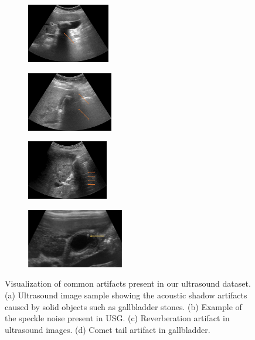 \begin{figure}[!t]
\centering
	\begin{subfigure}[b]{0.24\linewidth}
	\centering
	\includegraphics[width=\linewidth, height=7em]{figs/shadow.png}
		\caption{}
		\label{fig:usg_shadow}
	\end{subfigure}
	\begin{subfigure}[b]{0.24\linewidth}
	\centering
	\includegraphics[width=\linewidth, height=7em]{figs/speckle.png}
		\caption{}
		\label{fig:usg_speckle}
	\end{subfigure}
        \begin{subfigure}[b]{0.24\linewidth}
	\centering
	\includegraphics[width=\linewidth, height=7em]{figs/reverb.png}
		\caption{}
		\label{fig:usg_reverb}
	\end{subfigure}
        \begin{subfigure}[b]{0.24\linewidth}
	\centering
	\includegraphics[width=\linewidth, height=7em]{figs/comet_tail.png}
		\caption{}
		\label{fig:usg_comet}
	\end{subfigure}
	\caption[Visualization of common artifacts present in our data]{Visualization of common artifacts present in our ultrasound dataset. (a) Ultrasound image sample showing the acoustic shadow artifacts caused by solid objects such as gallbladder stones. (b) Example of the speckle noise present in USG. (c) Reverberation artifact in ultrasound images. (d) Comet tail artifact in gallbladder. }
    \label{fig:sample_artifact_usg}
\end{figure}


